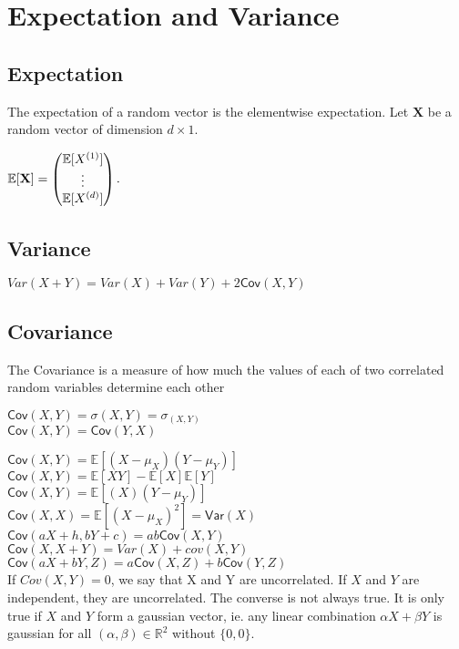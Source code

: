 \section{Expectation and Variance}
\subsection*{Expectation}

The expectation of a random vector is the elementwise expectation. Let $\mathbf X$  be a random vector of dimension $d \times 1$.\

$\displaystyle  \displaystyle \mathbb E[\mathbf X] = \displaystyle \begin{pmatrix} \mathbb E[X^{(1)}]\\ \vdots \\ \mathbb E[X^{(d)}]\end{pmatrix}.$\\

\subsection*{Variance}

$Var(X + Y)=Var(X)+Var(Y)+2\textsf{Cov}(X,Y)$
\subsection*{Covariance}

The Covariance is a measure of how much the values of each of two correlated random variables determine each other

$\textsf{Cov}(X,Y) = \sigma(X,Y) = \sigma_ {(X,Y)}$\\

$\textsf{Cov}(X,Y) = \textsf{Cov}(Y,X)$

$\textsf{Cov}(X,Y) = \mathbb E[(X - \mu _ X)(Y - \mu _ Y)]$ \\

$\textsf{Cov}(X,Y) = \mathbb E[XY] - \mathbb E[X]\mathbb E[Y] $\\

$ \textsf{Cov}(X,Y)= \displaystyle  \mathbb E[(X)(Y-\mu _ Y)]$\\

$\textsf{Cov}(X,X) = \mathbb E[(X - \mu _ X)^2] = \textsf{Var}(X)$\\

$\textsf{Cov}(aX + h,bY + c)= ab\textsf{Cov}(X,Y)$\\

$\textsf{Cov}(X,X + Y)= Var(X) + cov(X,Y)$\\

$\displaystyle  \textsf{Cov}(aX+ bY, Z) \displaystyle = a\textsf{Cov}(X,Z) + b\textsf{Cov}(Y,Z)$\\

If $Cov(X,Y) = 0$, we say that X and Y are uncorrelated. If $X$ and $Y$ are independent, they are uncorrelated. The converse is not always true. It is only true if $X$ and $Y$ form a gaussian vector, ie. any linear combination $\alpha X + \beta Y$ is gaussian for all $(\alpha,\beta) \in \mathbb{R}^2$ without $\{0,0\}$.